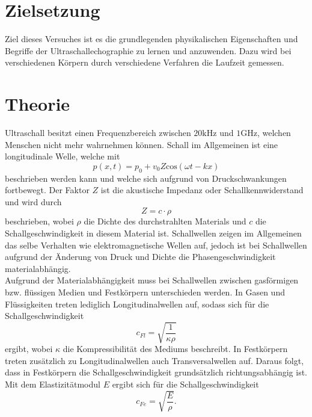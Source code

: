 \section{Zielsetzung}
\label{sec:Zielsetzung}
Ziel dieses Versuches ist es die grundlegenden physikalischen Eigenschaften und Begriffe der Ultraschallechographie zu lernen und anzuwenden. 
Dazu wird bei verschiedenen Körpern durch verschiedene Verfahren die Laufzeit gemessen.

\section{Theorie}
\label{sec:Theorie}
Ultraschall besitzt einen Frequenzbereich zwischen $20 \si{\kilo\Hz}$ und $1 \si{\giga\Hz}$, welchen Menschen nicht mehr wahrnehmen können.
Schall im Allgemeinen ist eine longitudinale Welle, welche mit 
\begin{equation*}
    p(x,t) = p_0 + v_0 Z \text{cos}(\omega t - k x)
\end{equation*}
beschrieben werden kann und welche sich aufgrund von Druckschwankungen fortbewegt.
Der Faktor $Z$ ist die akustische Impedanz oder Schallkennwiderstand und wird durch
\begin{equation*}
    Z = c \cdot \rho 
    \label{eqn:Impedanz}
\end{equation*}
beschrieben, wobei $\rho$ die Dichte des durchstrahlten Materials und $c$ die Schallgeschwindigkeit in diesem Material ist.
Schallwellen zeigen im Allgemeinen das selbe Verhalten wie elektromagnetische Wellen
auf, jedoch ist bei Schallwellen aufgrund der Änderung von Druck und Dichte die
Phasengeschwindigkeit materialabhängig.\\
Aufgrund der Materialabhängigkeit muss bei Schallwellen zwischen gasförmigen bzw. flüssigen Medien und Festkörpern unterschieden werden.
In Gasen und Flüssigkeiten treten lediglich Longitudinalwellen auf, sodass sich für die Schallgeschwindigkeit
\begin{equation*}
    c_{Fl} = \sqrt{\frac{1}{\kappa \rho}}
    \label{eqn:cFlüssig}
\end{equation*}
ergibt, wobei $\kappa$ die Kompressibilität des Mediums beschreibt.
In Festkörpern treten zusätzlich zu Longitudinalwellen auch Transversalwellen auf. Daraus folgt, dass in Festkörpern die Schallgeschwindigkeit 
grundsätzlich richtungsabhängig ist.
Mit dem Elastizitätmodul $E$ ergibt sich für die Schallgeschwindigkeit
\begin{equation*}
    c_{Fe} = \sqrt{\frac{E}{\rho}}.
    \label{eqn:cFest}
\end{equation*}
